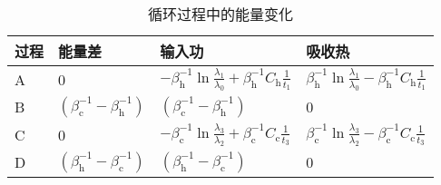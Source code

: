 \begin{table}[!htbp]
    \caption{循环过程中的能量变化}
    \centering
    \begin{tabular}{p{}p{}p{}p{}}
    \hline
    过程  & 能量差  & 输入功     & 吸收热 \\ 
    \hline
    A    & 0       & $-\beta_{\mathrm{h}}^{-1} \ln{\frac{\lambda_1}{\lambda_0}} + \beta_{\mathrm{h}}^{-1} C_{\mathrm{h}} \frac{1}{t_1}$                    &$\beta_{\mathrm{h}}^{-1} \ln{\frac{\lambda_1}{\lambda_0}} - \beta_{\mathrm{h}}^{-1} C_{\mathrm{h}} \frac{1}{t_1}$     \\ 
    
    B    & $(\beta_{\mathrm{c}}^{-1} - \beta_{\mathrm{h}}^{-1})$ & $(\beta_{\mathrm{c}}^{-1} - \beta_{\mathrm{h}}^{-1})$ & 0   \\ 
    
    C    & 0       & $-\beta_{\mathrm{c}}^{-1} \ln{\frac{\lambda_3}{\lambda_2}} + \beta_{\mathrm{c}}^{-1} C_{\mathrm{c}} \frac{1}{t_3}$                    &$\beta_{\mathrm{c}}^{-1} \ln{\frac{\lambda_3}{\lambda_2}} - \beta_{\mathrm{c}}^{-1} C_{\mathrm{c}} \frac{1}{t_3}$     \\ 
    
    D    & $(\beta_{\mathrm{h}}^{-1} - \beta_{\mathrm{c}}^{-1})$ & $(\beta_{\mathrm{h}}^{-1} - \beta_{\mathrm{c}}^{-1})$                         & 0   \\ 
    \hline
    \end{tabular}
    \label{t3.2}
\end{table}

